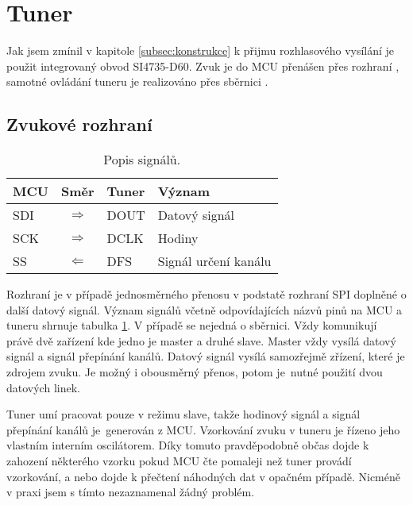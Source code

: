 \section{Tuner}
\label{sec:tuner}
Jak jsem zmínil v kapitole \ref{subsec:konstrukce} k přijmu rozhlasového vysílání je použit integrovaný obvod SI4735-D60. Zvuk je do MCU přenášen přes rozhraní \iis, samotné ovládání tuneru je realizováno přes sběrnici \iic.

\subsection{Zvukové rozhraní \iis}

\begin{table}[ht!]
\begin{center}
\begin{tabular}{|l|c|l|l|}
\hline 
MCU & Směr & Tuner & Význam \\ 
\hline 
SDI & $\Rightarrow$ & DOUT & Datový signál \\ 
\hline 
SCK & $\Rightarrow$ & DCLK & Hodiny \\ 
\hline
SS & $\Leftarrow$ & DFS & Signál určení kanálu \\ 
\hline 
\end{tabular}
\end{center}
\caption{Popis \iis signálů.}
\label{tab:iis_signals} 
\end{table}


Rozhraní \iis je v případě jednosměrného přenosu v podstatě rozhraní SPI doplněné o další datový signál. Význam signálů včetně odpovídajících názvů pinů na MCU a tuneru shrnuje tabulka \ref{tab:iis_signals}. V případě \iis se nejedná o sběrnici. Vždy komunikují právě dvě zařízení kde jedno je master a druhé slave. Master vždy vysílá datový signál a signál přepínání kanálů. Datový signál vysílá samozřejmě zřízení, které je zdrojem zvuku. Je možný i obousměrný přenos, potom je~nutné použití dvou datových linek.

Tuner umí pracovat pouze v režimu slave, takže hodinový signál a signál přepínání kanálů je~generován z MCU. Vzorkování zvuku v tuneru je řízeno jeho vlastním interním oscilátorem. Díky tomuto pravděpodobně občas dojde k zahození některého vzorku pokud MCU čte pomaleji než tuner provádí vzorkování, a nebo dojde k přečtení náhodných dat v opačném případě. Nicméně v praxi jsem s tímto nezaznamenal žádný problém.  


